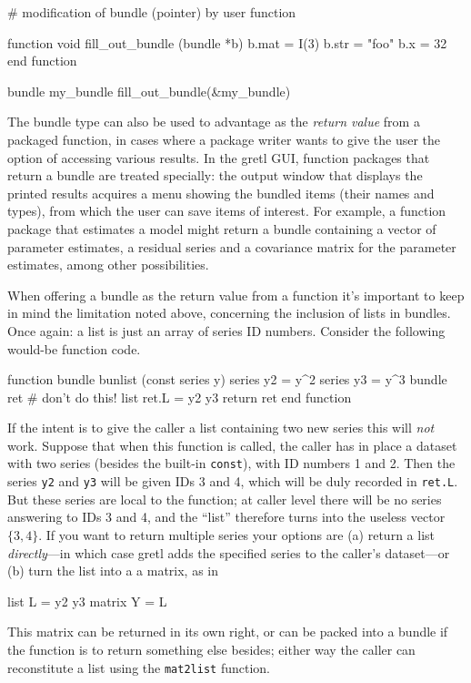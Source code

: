 \begin{code}
# modification of bundle (pointer) by user function

function void fill_out_bundle (bundle *b)
  b.mat =  I(3)
  b.str = "foo"
  b.x = 32
end function

bundle my_bundle 
fill_out_bundle(&my_bundle)
\end{code}

The bundle type can also be used to advantage as the \textit{return
  value} from a packaged function, in cases where a package writer
wants to give the user the option of accessing various results. In the
gretl GUI, function packages that return a bundle are treated
specially: the output window that displays the printed results
acquires a menu showing the bundled items (their names and types),
from which the user can save items of interest. For example, a
function package that estimates a model might return a bundle 
containing a vector of parameter estimates, a residual series and a
covariance matrix for the parameter estimates, among other
possibilities.

When offering a bundle as the return value from a function it's
important to keep in mind the limitation noted above, concerning the
inclusion of lists in bundles. Once again: a list is just an array of
series ID numbers. Consider the following would-be function code.

\begin{code}
function bundle bunlist (const series y)
  series y2 = y^2
  series y3 = y^3
  bundle ret
  # don't do this!
  list ret.L = y2 y3
  return ret
end function
\end{code}

If the intent is to give the caller a list containing two new series
this will \textit{not} work. Suppose that when this function is
called, the caller has in place a dataset with two series (besides the
built-in \texttt{const}), with ID numbers 1 and 2. Then the series
\texttt{y2} and \texttt{y3} will be given IDs 3 and 4, which will be
duly recorded in \texttt{ret.L}. But these series are local to the
function; at caller level there will be no series answering to IDs 3
and 4, and the ``list'' therefore turns into the useless vector
$\{3, 4\}$. If you want to return multiple series your options are (a)
return a list \textit{directly}---in which case gretl adds the
specified series to the caller's dataset---or (b) turn the list into a
a matrix, as in
\begin{code}
list L = y2 y3
matrix Y = {L}
\end{code}
This matrix can be returned in its own right, or can be packed into a
bundle if the function is to return something else besides; either way
the caller can reconstitute a list using the \texttt{mat2list}
function.

